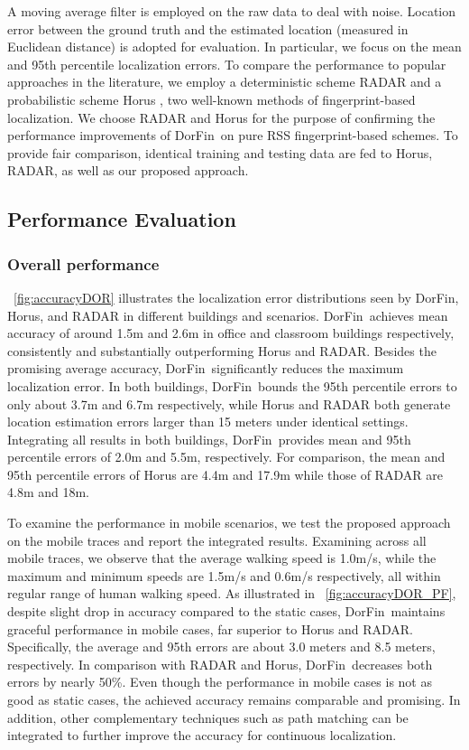 \documentclass[10pt,conference,compsocconf,letterpaper]{./sty/IEEEtran}
\def\sysname{DorFin}
\newcommand{\rev}[1]{{\color{blue}#1}} \newcommand{\com}[1]{\textbf{\color{red}(COMMENT: #1)}} \else
\newcommand{\rev}[1]{#1}
\newcommand{\com}[1]{}
\begin{document}
A moving average filter is employed on the raw data to deal with noise. 
Location error between the ground truth and the estimated location (measured in Euclidean distance) is adopted for evaluation. In particular, we focus on the mean and 95th percentile localization errors.
To compare the performance to popular approaches in the literature, we employ a deterministic scheme RADAR \cite{bahl_radar_2000} and a probabilistic scheme Horus \cite{youssef_horus_2005}, two well-known methods of fingerprint-based localization. We choose RADAR and Horus for the purpose of confirming the performance improvements of \sysname~on pure RSS fingerprint-based schemes. To provide fair comparison, identical training and testing data are fed to Horus, RADAR, as well as our proposed approach.



\subsection{Performance Evaluation}

\subsubsection{Overall performance}
\figurename~\ref{fig:accuracyDOR} illustrates the localization error distributions seen by \sysname, Horus, and RADAR in different buildings and scenarios. \sysname~achieves mean accuracy of around 1.5m and 2.6m in office and classroom buildings respectively, consistently and substantially outperforming Horus and RADAR. Besides the promising average accuracy, \sysname~significantly reduces the maximum localization error. In both buildings, \sysname~bounds the 95th percentile errors to only about 3.7m and 6.7m respectively, while Horus and RADAR both generate location estimation errors larger than 15 meters under identical settings. Integrating all results in both buildings, \sysname~provides mean and 95th percentile errors of 2.0m and 5.5m, respectively. For comparison, the mean and 95th percentile errors of Horus are 4.4m and 17.9m while those of RADAR are 4.8m and 18m.

To examine the performance in mobile scenarios, we test the proposed approach on the mobile traces and report the integrated results.
Examining across all mobile traces, we observe that the average walking speed is 1.0m/s, while the maximum and minimum speeds are 1.5m/s and 0.6m/s respectively, all within regular range of human  walking speed.
As illustrated in \figurename~\ref{fig:accuracyDOR_PF}, despite slight drop in accuracy compared to the static cases, \sysname~maintains graceful performance in mobile cases, far superior to Horus and RADAR. Specifically, the average and 95th errors are about 3.0 meters and 8.5 meters, respectively. \rev{In comparison with RADAR and Horus, \sysname~decreases both errors by nearly 50\%.}  Even though the performance in mobile cases is not as good as static cases, the achieved accuracy remains comparable and promising. In addition, other complementary techniques such as path matching \cite{Yoon2013FM} can be integrated to further improve the accuracy for continuous localization.
\end{document}
